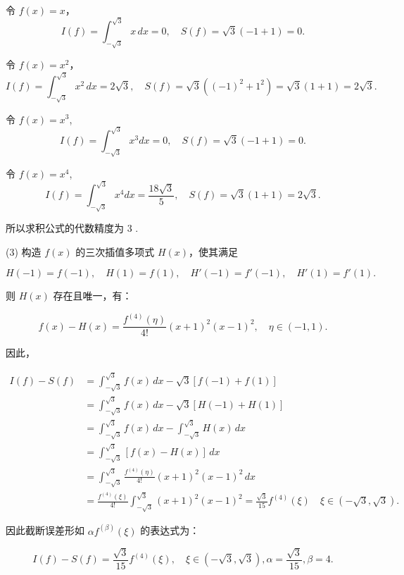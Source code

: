 \begin{tcolorbox}
令 $f(x) = x$，
\[
I(f) = \int_{-\sqrt{3}}^{\sqrt{3}} x \, dx = 0, \quad S(f) = \sqrt{3}(-1 + 1) = 0.
\]

令 $f(x) = x^2$，
\[
I(f) = \int_{-\sqrt{3}}^{\sqrt{3}} x^2 \, dx = 2 \sqrt{3} ,
\quad S(f) = \sqrt{3}((-1)^2 + 1^2) = \sqrt{3}(1 + 1) = 2\sqrt{3}.
\]


 令 $f(x)=x^{3}$,
$$I(f)=\int_{-\sqrt{3}}^{\sqrt{3}} x^{3} d x=0,\quad S(f)=\sqrt{3}(-1+1)=0 .$$


 令 $f(x)=x^{4}$,
$$I(f)=\int_{-\sqrt{3}}^{\sqrt{3}} x^{4} d x=\frac{18\sqrt{3}}{5}, \quad S(f)=\sqrt{3}(1+1)= 2\sqrt{3}.$$

所以求积公式的代数精度为 3 .


 (3) 构造 $f(x)$ 的三次插值多项式 $H(x)$，使其满足

\[
H(-1) = f(-1), \quad H(1) = f(1), \quad H'(-1) = f'(-1), \quad H'(1) = f'(1).
\]

则 $H(x)$ 存在且唯一，有：

\[
f(x) - H(x) = \frac{f^{(4)}(\eta)}{4!}(x+1)^2(x-1)^2, \quad \eta \in (-1, 1).
\]

因此，

\[\begin{aligned}
    I(f) - S(f) &= \int_{-\sqrt{3}}^{\sqrt{3}} f(x) \, dx - \sqrt{3}[f(-1) + f(1)] \\&= \int_{-\sqrt{3}}^{\sqrt{3}} f(x) \, dx - \sqrt{3}[H(-1) + H(1)] \\&=\int_{-\sqrt{3}}^{\sqrt{3}} f(x) \, dx -\int_{-\sqrt{3}}^{\sqrt{3}}H(x)\, dx \\&=\int_{-\sqrt{3}}^{\sqrt{3}} [f(x)-H(x)] \, dx \\&= \int_{-\sqrt{3}}^{\sqrt{3}}  \frac{f^{(4)}(\eta)}{4!}(x+1)^2(x-1)^2 \, dx\\&= \frac{f^{(4)}(\xi)}{4!}\int_{-\sqrt{3}}^{\sqrt{3}}(x+1)^2(x-1)^2= \frac{\sqrt{3}}{15} f^{(4)}(\xi)\quad \xi \in (-\sqrt{3}, \sqrt{3}).
\end{aligned}
\]

因此截断误差形如 $\alpha f^{(\beta)}(\xi)$ 的表达式为：

\[
I(f) - S(f) = \frac{\sqrt{3}}{15} f^{(4)}(\xi), \quad \xi \in (-\sqrt{3}, \sqrt{3}), \alpha = \frac{\sqrt{3}}{15}, \beta = 4.
\]

  \end{tcolorbox}


